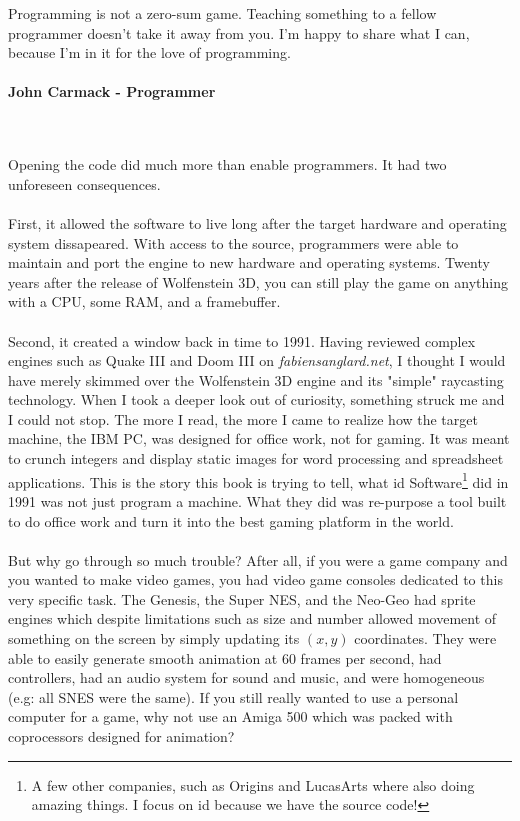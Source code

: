  \begin{fancyquotes}
   Programming is not a zero-sum game. Teaching something to a fellow programmer doesn't take it away from you. I'm happy to share what I can, because I'm in it for the love of programming.\\
   \\
\textbf{John Carmack - Programmer}
 \end{fancyquotes}\\
\\
Opening the code did much more than enable programmers. It had two unforeseen consequences.\\
\\
First, it allowed the software to live long after the target hardware and operating system dissapeared. With access to the source, programmers were able to maintain and port the engine to new hardware and operating systems. Twenty years after the release of Wolfenstein 3D, you can still play the game on anything with a CPU, some RAM, and a framebuffer. \\
\\
Second, it created a window back in time to 1991. Having reviewed complex engines such as Quake III and Doom III on \emph{fabiensanglard.net}, I thought I would have merely skimmed over the Wolfenstein 3D engine and its "simple" raycasting technology. When I took a deeper look out of curiosity, something struck me and I could not stop. The more I read, the more I came to realize how the target machine, the IBM PC, was designed for office work, not for gaming. It was meant to crunch integers and display static images for word processing and spreadsheet applications. This is the story this book is trying to tell, what id Software\footnote{A few other companies, such as Origins and LucasArts where also doing amazing things. I focus on id because we have the source code!} did in 1991 was not just program a machine. What they did was re-purpose a tool built to do office work and turn it into the best gaming platform in the world.\\
\\
But why go through so much trouble? After all, if you were a game company and you wanted to make video games, you had video game consoles dedicated to this very specific task. The Genesis, the Super NES, and the Neo-Geo had sprite engines which despite limitations such as size and number allowed movement of something on the screen by simply updating its $(x,y)$ coordinates. They were able to easily generate smooth animation at 60 frames per second, had controllers, had an audio system for sound and music, and were homogeneous (e.g: all SNES were the same). If you still really wanted to use a personal computer for a game, why not use an Amiga 500 which was packed with coprocessors designed for animation?\\
